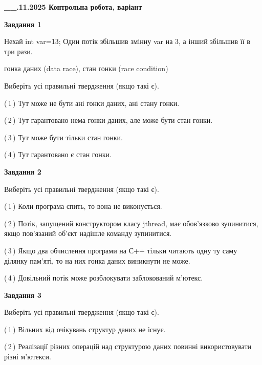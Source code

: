 \documentclass[12pt, ukrainian]{article}
\begin{document}
\begin {large}

\textbf{\_\_.11.2025 Контрольна робота, варіант  }\par


{

\begin{center}
\textbf{Завдання 1}
\end{center}
Нехай int var=13; Один потік збільшив змінну var на 3, а інший збільшив її в три рази.

гонка даних (data race), стан гонки (race condition)

Виберіть усі правильні твердження (якщо такі є).\par
\vspace{2mm}
(\,1\,) Тут може не бути ані гонки даних, ані стану гонки.%

(\,2\,) Тут гарантовано нема гонки даних, але може бути стан гонки.%

(\,3\,) Тут може бути тільки стан гонки.%

(\,4\,) Тут гарантовано є стан гонки.%



\begin{center}
\textbf{Завдання 2}
\end{center}
Виберіть усі правильні твердження (якщо такі є).\par
\vspace{2mm}

(\,1\,) Коли програма спить, то вона не виконується.%

(\,2\,) Потік, запущений конструктором класу jthread, має обов’язково зупинитися, якщо пов’язаний об’єкт надішле команду зупинитися.%

(\,3\,) Якщо два обчислення програми на С++ тільки читають одну ту саму ділянку пам'яті, то на них гонка даних  виникнути не може.%

(\,4\,) Довільний потік може розблокувати заблокований м’ютекс.%



\begin{center}
\textbf{Завдання 3}
\end{center}
Виберіть усі правильні твердження (якщо такі є).\par
\vspace{2mm}

(\,1\,) Вільних від очікувань структур даних не існує.%

(\,2\,) Реалізації різних операцій над структурою даних повинні використовувати різні м’ютекси.%

}
\end{large}
\end{document}
